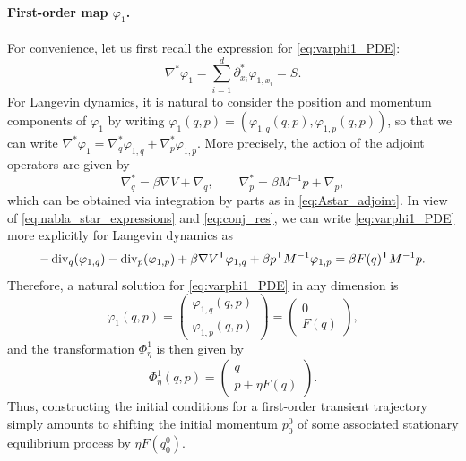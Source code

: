 \paragraph{First-order map $\varphi_1$.} For convenience, let us first recall the expression for \eqref{eq:varphi1_PDE}: %
%
\begin{equation}
	\nabla^*\varphi_1 = \sum_{i=1}^d \partial_{x_i}^* \varphi_{1,x_i} = S. %
\end{equation}
%
For Langevin dynamics, it is natural to consider the position and momentum components of $\varphi_1$ by writing $\varphi_1(q,p) = (\varphi_{1,q}(q,p), \varphi_{1,p}(q,p))$, so that we can write $\nabla^*\varphi_1 = \nabla^*_q\varphi_{1,q} + \nabla^*_p\varphi_{1,p}$. More precisely, the action of the adjoint operators are given by
%
\begin{equation}
	\nabla^*_q = \beta\nabla V + \nabla_q, \qquad \nabla^*_p = \beta M^{-1}p + \nabla_p,
	\label{eq:nabla_star_expressions}
\end{equation}
%
which can be obtained via integration by parts as in \eqref{eq:Astar_adjoint}. In view of \eqref{eq:nabla_star_expressions} and \eqref{eq:conj_res}, we can write \eqref{eq:varphi1_PDE} more explicitly for Langevin dynamics as
%
\begin{equation}
	-\operatorname{div}_q(\varphi_{1,q}) - \operatorname{div}_p(\varphi_{1,p}) + \beta \nabla V^\mathsf T \varphi_{1,q} + \beta p^\mathsf T M^{-1} \varphi_{1,p} = \beta F(q)^\mathsf T M^{-1} p.
\end{equation}
%
Therefore, a natural solution for \eqref{eq:varphi1_PDE} in any dimension is
%
\begin{equation}
	\varphi_1(q,p) = \begin{pmatrix}
 	\varphi_{1,q}(q,p) \\ \varphi_{1,p}(q,p)
 	\end{pmatrix} =
	\begin{pmatrix}
 	0 \\ F(q)
 	\end{pmatrix},
 	\label{eq:varphi1_sol}
\end{equation}
%
and the transformation $\Phi^1_\eta$ is then given by
%
\begin{equation}
	\Phi_\eta^1(q,p) = 
	\begin{pmatrix}
 	  q \\ p + \eta F(q)
 	\end{pmatrix}.
\end{equation}
%
Thus, constructing the initial conditions for a first-order transient trajectory simply amounts to shifting the initial momentum $p_0^0$ of some associated stationary equilibrium process by $\eta F(q_0^0)$.

